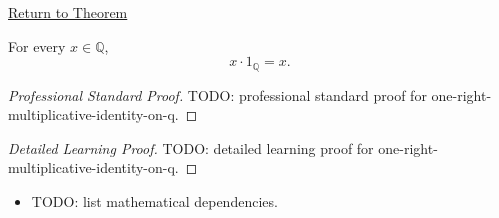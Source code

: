 \newpage
{}
\label{prf:one-right-multiplicative-identity-on-q}

\begin{remark*}[Return]
\hyperref[cor:one-right-multiplicative-identity-on-q]{Return to Theorem}
\end{remark*}

\begin{corollary*}
For every $x\in\mathbb{Q}$,
\[
x\cdot 1_{\mathbb{Q}}=x.
\]
\end{corollary*}

\begin{proof}[Professional Standard Proof]
\LRAProofBodyStart
TODO: professional standard proof for one-right-multiplicative-identity-on-q.
\end{proof}

\begin{proof}[Detailed Learning Proof]
\LRAProofBodyStart
TODO: detailed learning proof for one-right-multiplicative-identity-on-q.
\end{proof}

\begin{remark*}
\end{remark*}

\begin{dependencies}
\begin{itemize}
  \item TODO: list mathematical dependencies.
\end{itemize}
\end{dependencies}

\clearpage
